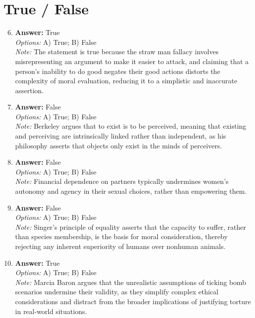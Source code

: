 \documentclass[12pt]{article}
\begin{document}
\section*{True / False}
\begin{enumerate}[label=\arabic*.]
\setcounter{enumi}{5}
\item \textbf{Answer:} True
\\ \textit{Options:} A) True; B) False
\\ \textit{Note:} The statement is true because the straw man fallacy involves misrepresenting an argument to make it easier to attack, and claiming that a person's inability to do good negates their good actions distorts the complexity of moral evaluation, reducing it to a simplistic and inaccurate assertion.
\item \textbf{Answer:} False
\\ \textit{Options:} A) True; B) False
\\ \textit{Note:} Berkeley argues that to exist is to be perceived, meaning that existing and perceiving are intrinsically linked rather than independent, as his philosophy asserts that objects only exist in the minds of perceivers.
\item \textbf{Answer:} False
\\ \textit{Options:} A) True; B) False
\\ \textit{Note:} Financial dependence on partners typically undermines women's autonomy and agency in their sexual choices, rather than empowering them.
\item \textbf{Answer:} False
\\ \textit{Options:} A) True; B) False
\\ \textit{Note:} Singer's principle of equality asserts that the capacity to suffer, rather than species membership, is the basis for moral consideration, thereby rejecting any inherent superiority of humans over nonhuman animals.
\item \textbf{Answer:} True
\\ \textit{Options:} A) True; B) False
\\ \textit{Note:} Marcia Baron argues that the unrealistic assumptions of ticking bomb scenarios undermine their validity, as they simplify complex ethical considerations and distract from the broader implications of justifying torture in real-world situations.
\end{enumerate}
\end{document}
